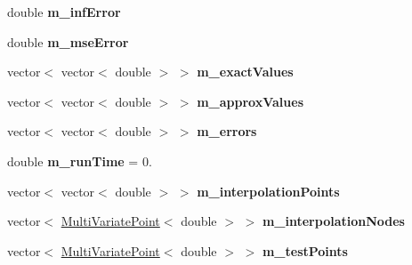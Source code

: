 \begin{DoxyCompactItemize}
\item 
double {\bfseries m\+\_\+inf\+Error}\hypertarget{class_interpolation_a1d083a2ff347e984973eff40a324f1fc}{}\label{class_interpolation_a1d083a2ff347e984973eff40a324f1fc}

\item 
double {\bfseries m\+\_\+mse\+Error}\hypertarget{class_interpolation_a183d7179ea92d9fcb0e9055a815676b8}{}\label{class_interpolation_a183d7179ea92d9fcb0e9055a815676b8}

\item 
vector$<$ vector$<$ double $>$ $>$ {\bfseries m\+\_\+exact\+Values}\hypertarget{class_interpolation_a7803c20fc8dab69981711ded82cee749}{}\label{class_interpolation_a7803c20fc8dab69981711ded82cee749}

\item 
vector$<$ vector$<$ double $>$ $>$ {\bfseries m\+\_\+approx\+Values}\hypertarget{class_interpolation_af16fffc8a282e0e29d6f79fcb9cdcd00}{}\label{class_interpolation_af16fffc8a282e0e29d6f79fcb9cdcd00}

\item 
vector$<$ vector$<$ double $>$ $>$ {\bfseries m\+\_\+errors}\hypertarget{class_interpolation_a58fc987e95030cd47b5954440f6062f4}{}\label{class_interpolation_a58fc987e95030cd47b5954440f6062f4}

\item 
double {\bfseries m\+\_\+run\+Time} = 0.\hypertarget{class_interpolation_a384600c1a97ef6592b59c78bef102c6f}{}\label{class_interpolation_a384600c1a97ef6592b59c78bef102c6f}

\item 
vector$<$ vector$<$ double $>$ $>$ {\bfseries m\+\_\+interpolation\+Points}\hypertarget{class_interpolation_a60e1bdf1adbc7fb5eae27b8d439124be}{}\label{class_interpolation_a60e1bdf1adbc7fb5eae27b8d439124be}

\item 
vector$<$ \hyperlink{class_multi_variate_point}{Multi\+Variate\+Point}$<$ double $>$ $>$ {\bfseries m\+\_\+interpolation\+Nodes}\hypertarget{class_interpolation_aab428f896fb29cda3f393267801c6bb0}{}\label{class_interpolation_aab428f896fb29cda3f393267801c6bb0}

\item 
vector$<$ \hyperlink{class_multi_variate_point}{Multi\+Variate\+Point}$<$ double $>$ $>$ {\bfseries m\+\_\+test\+Points}\hypertarget{class_interpolation_af12eca065aea0c9ba4fb8529d925c916}{}\label{class_interpolation_af12eca065aea0c9ba4fb8529d925c916}

\end{DoxyCompactItemize}


